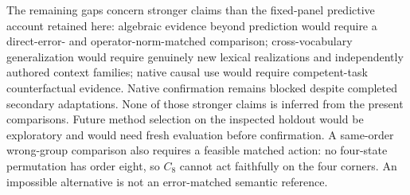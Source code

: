 The remaining gaps concern stronger claims than the fixed-panel predictive account retained here: algebraic evidence beyond prediction would require a direct-error- and operator-norm-matched comparison; cross-vocabulary generalization would require genuinely new lexical realizations and independently authored context families; native causal use would require competent-task counterfactual evidence. Native confirmation remains blocked despite completed secondary adaptations. None of those stronger claims is inferred from the present comparisons. Future method selection on the inspected holdout would be exploratory and would need fresh evaluation before confirmation. A same-order wrong-group comparison also requires a feasible matched action: no four-state permutation has order eight, so $C_8$ cannot act faithfully on the four corners. An impossible alternative is not an error-matched semantic reference.
